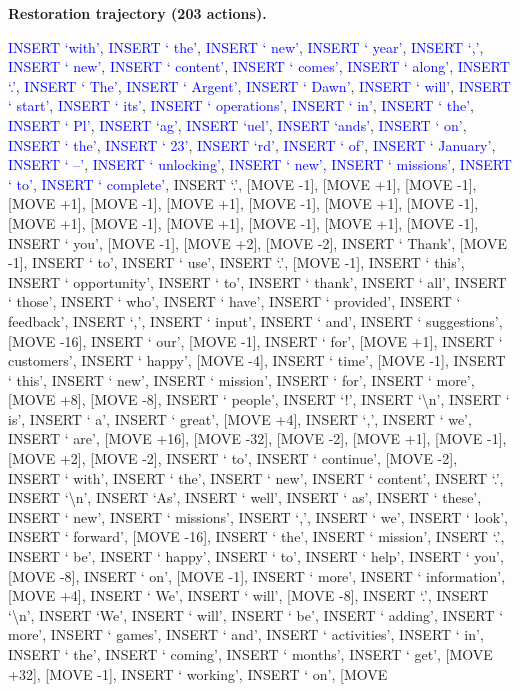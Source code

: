 \documentclass[11pt]{article}
\begin{document}
\vspace{0.4em}
\textbf{Restoration trajectory (203 actions).}\par
{
\ttfamily\scriptsize\raggedright\setlength{\parindent}{0pt}
\textcolor{blue}{INSERT `with'}, \textcolor{blue}{INSERT ` the'}, \textcolor{blue}{INSERT ` new'}, \textcolor{blue}{INSERT ` year'}, \textcolor{blue}{INSERT `,'}, \textcolor{blue}{INSERT ` new'}, \textcolor{blue}{INSERT ` content'}, \textcolor{blue}{INSERT ` comes'}, \textcolor{blue}{INSERT ` along'}, \textcolor{blue}{INSERT `.'}, \textcolor{blue}{INSERT ` The'}, \textcolor{blue}{INSERT ` Argent'}, \textcolor{blue}{INSERT ` Dawn'}, \textcolor{blue}{INSERT ` will'}, \textcolor{blue}{INSERT ` start'}, \textcolor{blue}{INSERT ` its'}, \textcolor{blue}{INSERT ` operations'}, \textcolor{blue}{INSERT ` in'}, \textcolor{blue}{INSERT ` the'}, \textcolor{blue}{INSERT ` Pl'}, \textcolor{blue}{INSERT `ag'}, \textcolor{blue}{INSERT `uel'}, \textcolor{blue}{INSERT `ands'}, \textcolor{blue}{INSERT ` on'}, \textcolor{blue}{INSERT ` the'}, \textcolor{blue}{INSERT ` 23'}, \textcolor{blue}{INSERT `rd'}, \textcolor{blue}{INSERT ` of'}, \textcolor{blue}{INSERT ` January'}, \textcolor{blue}{INSERT ` –'}, \textcolor{blue}{INSERT ` unlocking'}, \textcolor{blue}{INSERT ` new'}, \textcolor{blue}{INSERT ` missions'}, \textcolor{blue}{INSERT ` to'}, \textcolor{blue}{INSERT ` complete'}, INSERT `.', [MOVE -1], [MOVE +1], [MOVE -1], [MOVE +1], [MOVE -1], [MOVE +1], [MOVE -1], [MOVE +1], [MOVE -1], [MOVE +1], [MOVE -1], [MOVE +1], [MOVE -1], [MOVE +1], [MOVE -1], INSERT ` you', [MOVE -1], [MOVE +2], [MOVE -2], INSERT ` Thank', [MOVE -1], INSERT ` to', INSERT ` use', INSERT `.', [MOVE -1], INSERT ` this', INSERT ` opportunity', INSERT ` to', INSERT ` thank', INSERT ` all', INSERT ` those', INSERT ` who', INSERT ` have', INSERT ` provided', INSERT ` feedback', INSERT `,', INSERT ` input', INSERT ` and', INSERT ` suggestions', [MOVE -16], INSERT ` our', [MOVE -1], INSERT ` for', [MOVE +1], INSERT ` customers', INSERT ` happy', [MOVE -4], INSERT ` time', [MOVE -1], INSERT ` this', INSERT ` new', INSERT ` mission', INSERT ` for', INSERT ` more', [MOVE +8], [MOVE -8], INSERT ` people', INSERT `!', INSERT `\textbackslash{}n', INSERT ` is', INSERT ` a', INSERT ` great', [MOVE +4], INSERT `,', INSERT ` we', INSERT ` are', [MOVE +16], [MOVE -32], [MOVE -2], [MOVE +1], [MOVE -1], [MOVE +2], [MOVE -2], INSERT ` to', INSERT ` continue', [MOVE -2], INSERT ` with', INSERT ` the', INSERT ` new', INSERT ` content', INSERT `.', INSERT `\textbackslash{}n', INSERT `As', INSERT ` well', INSERT ` as', INSERT ` these', INSERT ` new', INSERT ` missions', INSERT `,', INSERT ` we', INSERT ` look', INSERT ` forward', [MOVE -16], INSERT ` the', INSERT ` mission', INSERT `.', INSERT ` be', INSERT ` happy', INSERT ` to', INSERT ` help', INSERT ` you', [MOVE -8], INSERT ` on', [MOVE -1], INSERT ` more', INSERT ` information', [MOVE +4], INSERT ` We', INSERT ` will', [MOVE -8], INSERT `.', INSERT `\textbackslash{}n', INSERT `We', INSERT ` will', INSERT ` be', INSERT ` adding', INSERT ` more', INSERT ` games', INSERT ` and', INSERT ` activities', INSERT ` in', INSERT ` the', INSERT ` coming', INSERT ` months', INSERT ` get', [MOVE +32], [MOVE -1], INSERT ` working', INSERT ` on', [MOVE }
\end{document}
